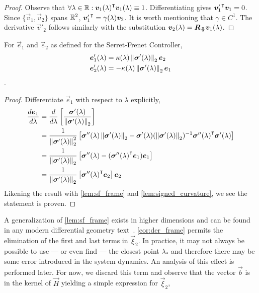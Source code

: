 \begin{proof}
    Observe that $\forall \lambda\in\mathbb{R} : {\bm{v}_1(\lambda)}^{\intercal}\bm{v}_1(\lambda)\equiv 1$. Differentiating gives ${\bm{v}'_1}^{\intercal}\bm{v}_1=0$. Since $\{\vec{v}_1,\vec{v}_2\}$ spans $\mathbb{R}^2$, ${\bm{v}'_1}^{\intercal}=\gamma(\lambda)\bm{v}_2$. It is worth mentioning that $\gamma\in C^1$. The derivative $\vec{v}'_2$ follows similarly with the substitution $\bm{v}_2(\lambda)=\bm{R}_{\frac{\pi}{2}}\bm{v}_1(\lambda)$.
\end{proof}
\begin{corollary}
    For $\vec{e}_1$ and $\vec{e}_2$ as defined for the Serret-Frenet Controller,
    \begin{align*}
        \bm{e}'_1(\lambda) &= \kappa(\lambda)\mathop{}\!\left\|\bm{\sigma}'(\lambda)\right\|_2\bm{e}_2 \\
        \bm{e}'_2(\lambda) &= -\kappa(\lambda)\mathop{}\!\left\|\bm{\sigma}'(\lambda)\right\|_2\bm{e}_1
    \end{align*}.
    \label{cor:der_frame}
\end{corollary}
\begin{proof}
    Differentiate $\vec{e}_1$ with respect to $\lambda$ explicitly,
    \begin{align*}
        \frac{d\bm{e}_1}{d\lambda} &=  \frac{d}{d\lambda}\left[ \frac{\bm{\sigma}'(\lambda)}{\mathop{}\!\left\|\bm{\sigma}'(\lambda)\right\|_2}\right]\\
                                    &=  \frac{1}{\mathop{}\!\left\|\bm{\sigma}'(\lambda)\right\|_2^2}\left[\bm{\sigma}''(\lambda)\mathop{}\!\left\|\bm{\sigma}'(\lambda)\right\|_2-\bm{\sigma}'(\lambda)(\mathop{}\!\left\|\bm{\sigma}'(\lambda)\right\|_2)^{-1}{\bm{\sigma}''(\lambda)}^{\intercal}\bm{\sigma}'(\lambda)\right]\\
                                    &=  \frac{1}{\mathop{}\!\left\|\bm{\sigma}'(\lambda)\right\|_2}\left[\bm{\sigma}''(\lambda)-({\bm{\sigma}''(\lambda)}^{\intercal}\bm{e}_1)\bm{e}_1 \right]\\
                                    &=  \frac{1}{\mathop{}\!\left\|\bm{\sigma}'(\lambda)\right\|_2}\left[{\bm{\sigma}''(\lambda)}^{\intercal}\bm{e}_2\right]\bm{e}_2
    \end{align*}
    Likening the result with \eqref{lem:sf_frame} and \eqref{lem:signed_curvature}, we see the statement is proven.
\end{proof}
A generalization of \eqref{lem:sf_frame} exists in higher dimensions and can be found in any modern differential geometry text~\cite{Kuhnel06}. \eqref{cor:der_frame} permits the elimination of the first and last terms in $\vec{\xi}_2$. In practice, it may not always be possible to use --- or even find --- the closest point $\lambda_*$ and therefore there may be some error introduced in the system dynamics. An analysis of this effect is performed later. For now, we discard this term and observe that the vector $\vec{b}$ is in the kernel of $\vec{H}$ yielding a simple expression for $\vec{\xi}_2$,
